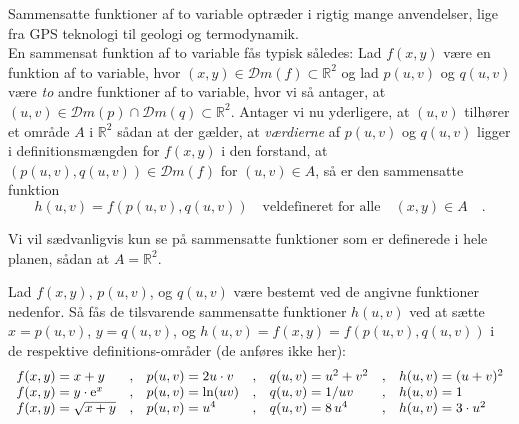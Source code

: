 Sammensatte funktioner af to variable optræder i rigtig mange anvendelser,
lige fra GPS teknologi til geologi og termodynamik. \\

En sammensat funktion af to variable
fås typisk således: Lad $f(x,y)$ være en funktion af to variable, hvor $(x,y) \in \mathcal{D}m(f) \subset \mathbb{R}^{2}$ og lad $p(u,v)$
og $q(u,v)$ være \emph{to} andre funktioner af to variable, hvor vi så antager, at $(u,v) \in \mathcal{D}m(p) \cap \mathcal{D}m(q) \subset \mathbb{R}^{2}$. Antager vi nu yderligere, at $(u,v)$ tilhører et område $A$ i $\mathbb{R}^{2}$ sådan at der gælder, at \emph{værdierne} af $p(u,v)$ og $q(u,v)$ ligger i definitionsmængden for $f(x,y)$ i den forstand, at $(p(u,v), q(u,v)) \in \mathcal{D}m(f)$ for $(u,v) \in A$,
så er den sammensatte funktion
\begin{equation}
h(u,v) = f(p(u,v), q(u,v)) \quad \textrm{veldefineret for alle} \quad (x,y) \in A \quad.
\end{equation}

Vi vil sædvanligvis kun se på sammensatte funktioner som er definerede i hele planen, sådan at  $A = \mathbb{R}^{2}$.

\begin{example}
Lad $f(x,y)$, $p(u,v)$, og $q(u,v)$ være bestemt ved de angivne funktioner nedenfor.  Så fås de tilsvarende sammensatte funktioner $h(u,v)$ ved at sætte $x= p(u,v)$, $y=q(u,v)$, og $h(u,v) = f(x,y) = f(p(u,v), q(u,v))$ i de respektive definitions-områder (de anføres ikke her):
\begin{equation}
\begin{array}{lllllll}
  f(x,y) = x+y & , & p(u,v) = 2u \cdot v  & , & q(u,v)= u^{2} + v^{2}& , & h(u,v) = (u + v)^{2}\\
  f(x,y) = y\cdot\mathrm{e}^{x} & , & p(u,v) = \ln(uv) & , & q(u,v)= 1/uv & , & h(u,v) = 1 \\
  f(x,y) = \sqrt{x + y} & , & p(u,v) = u^{4} & , & q(u,v)= 8\,u^{4}& , & h(u,v) = 3\cdot u^{2}\\
\end{array}
\end{equation}
\end{example}


